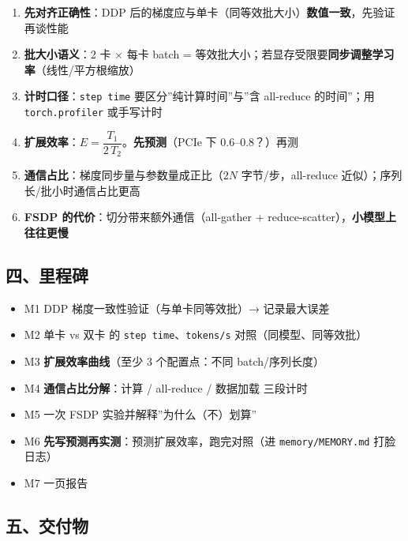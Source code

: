 \documentclass[
  chinese,
  11pt,
]{ctexart}
\providecommand{\tightlist}{%
  \setlength{\itemsep}{0pt}\setlength{\parskip}{0pt}}
\begin{document}
\begin{enumerate}
\def\labelenumi{\arabic{enumi}.}
\tightlist
\item
  \textbf{先对齐正确性}：DDP 后的梯度应与单卡（同等效批大小）\textbf{数值一致}，先验证再谈性能
\item
  \textbf{批大小语义}：2 卡 × 每卡 batch = 等效批大小；若显存受限要\textbf{同步调整学习率}（线性/平方根缩放）
\item
  \textbf{计时口径}：\texttt{step\ time} 要区分''纯计算时间''与''含 all-reduce 的时间''；用 \texttt{torch.profiler} 或手写计时
\item
  \textbf{扩展效率}：\(E = \dfrac{T_1}{2\,T_2}\)。\textbf{先预测}（PCIe 下 0.6--0.8？）再测
\item
  \textbf{通信占比}：梯度同步量与参数量成正比（\(2N\) 字节/步，all-reduce 近似）；序列长/批小时通信占比更高
\item
  \textbf{FSDP 的代价}：切分带来额外通信（all-gather + reduce-scatter），\textbf{小模型上往往更慢}
\end{enumerate}

\subsection{四、里程碑}\label{ux56dbux91ccux7a0bux7891}

\begin{itemize}
\tightlist
\item[$\square$]
  M1 DDP 梯度一致性验证（与单卡同等效批）→ 记录最大误差
\item[$\square$]
  M2 单卡 vs 双卡 的 \texttt{step\ time}、\texttt{tokens/s} 对照（同模型、同等效批）
\item[$\square$]
  M3 \textbf{扩展效率曲线}（至少 3 个配置点：不同 batch/序列长度）
\item[$\square$]
  M4 \textbf{通信占比分解}：计算 / all-reduce / 数据加载 三段计时
\item[$\square$]
  M5 一次 FSDP 实验并解释''为什么（不）划算''
\item[$\square$]
  M6 \textbf{先写预测再实测}：预测扩展效率，跑完对照（进 \texttt{memory/MEMORY.md} 打脸日志）
\item[$\square$]
  M7 一页报告
\end{itemize}

\subsection{五、交付物}\label{ux4e94ux4ea4ux4ed8ux7269}
\end{document}
